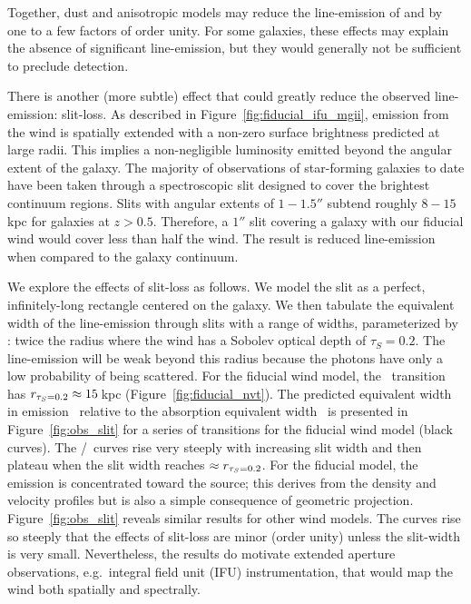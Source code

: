 \documentclass[12pt,preprint]{aastex}
\begin{document}
Together, dust and anisotropic models may reduce the line-emission
of  and 
by one to a few factors of order unity.  For some galaxies, these
effects may explain the absence of significant line-emission,
but they would generally
not be sufficient to preclude detection. 

There is another (more subtle) effect that could
greatly reduce the observed line-emission: slit-loss.  As
described in Figure~\ref{fig:fiducial_ifu_mgii}, 
emission from the wind is spatially extended with
a non-zero surface brightness predicted at large radii. This implies 
a non-negligible luminosity emitted beyond the angular extent of the galaxy.  
The majority of observations of star-forming galaxies to date have
been taken through a spectroscopic slit designed to cover
the brightest continuum regions. Slits with angular
extents of $1-1.5''$ subtend roughly $8-15$\,kpc for galaxies at $z>0.5$.
Therefore, a $1''$ slit covering a galaxy with our fiducial wind would cover
less than half the wind.  The result is reduced line-emission
when compared to the galaxy continuum.

We explore the effects of slit-loss as follows.
We model the slit as a perfect, infinitely-long rectangle centered on the
galaxy.  We then tabulate the equivalent width of the line-emission
through slits with a range of widths, parameterized by \rtt: twice the radius
where the wind has a Sobolev optical depth of $\tau_S = 0.2$. 
The line-emission will be weak beyond
this radius because the photons have only a low probability of
being scattered.  For the fiducial wind model, 
the \mgiia\ transition has $r_{\tau_S = 0.2} \approx 15$\,kpc 
(Figure~\ref{fig:fiducial_nvt}).  
The predicted equivalent width in emission \ewe\ relative to the absorption
equivalent width \ewabs\ is presented in
Figure~\ref{fig:obs_slit} for a series of transitions for the fiducial
wind model (black curves).
The \ewe/\ewabs\ curves rise very steeply with increasing slit width and then
plateau when the slit width reaches $\approx r_{\tau_S = 0.2}$.  
For the fiducial model, the emission is concentrated toward the source; this
derives from the density and velocity profiles but is also a simple
consequence of geometric projection.
Figure~\ref{fig:obs_slit} reveals similar results for other wind
models. The curves rise so steeply that 
the effects of slit-loss are minor (order unity)
unless the slit-width is very small.   
Nevertheless, the results do motivate
extended aperture observations, e.g.\ integral field unit (IFU)
instrumentation, that would map the wind both spatially and spectrally.
\end{document}
